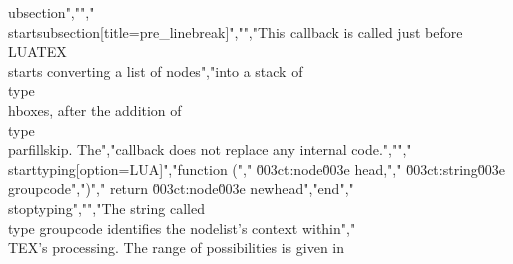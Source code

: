 ubsection","","\\startsubsection[title=pre_linebreak]","","This callback is called just before \\LUATEX\\ starts converting a list of nodes","into a stack of \\type {\\hbox}es, after the addition of \\type {\\parfillskip}. The","callback does not replace any internal code.","","\\starttyping[option=LUA]","function (","    \u003ct:node\u003e   head,","    \u003ct:string\u003e groupcode",")","    return \u003ct:node\u003e newhead","end","\\stoptyping","","The string called \\type {groupcode} identifies the nodelist's context within","\\TEX's processing. The range of possibilities is given in